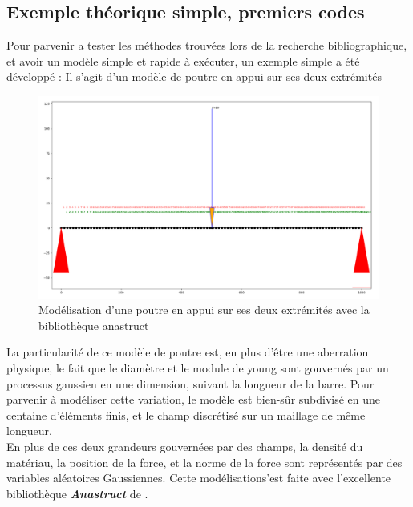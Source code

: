 \documentclass[a4paper,10pt]{article}
\begin{document}
\subsection{Exemple théorique simple, premiers codes}
Pour parvenir a tester les méthodes trouvées lors de la recherche bibliographique, et avoir un modèle simple et rapide à exécuter, un exemple simple a été développé : 
Il s'agit d'un modèle de poutre en appui sur ses deux extrémités
\begin{figure}[H]
   \centering   
   \includegraphics[scale=0.20]{beam_structure.png}
      \caption{Modélisation d'une poutre en appui sur ses deux extrémités avec la bibliothèque anastruct}
         \label{fig:nonfloat}
\end{figure}

La particularité de ce modèle de poutre est, en plus d'être une aberration physique, le fait que le diamètre et le module de young sont gouvernés par un processus gaussien en une dimension, suivant la longueur de la barre. Pour parvenir à modéliser cette variation, le modèle est bien-sûr subdivisé en une centaine d'éléments finis, et le champ discrétisé sur un maillage de même longueur.\\
En plus de ces deux grandeurs gouvernées par des champs, la densité du matériau, la position de la force, et la norme de la force sont représentés par des variables aléatoires Gaussiennes. Cette modélisations'est faite avec l'excellente bibliothèque \textbf{\textit{Anastruct}} de \cite{Vink2020Feb}.
\end{document}
